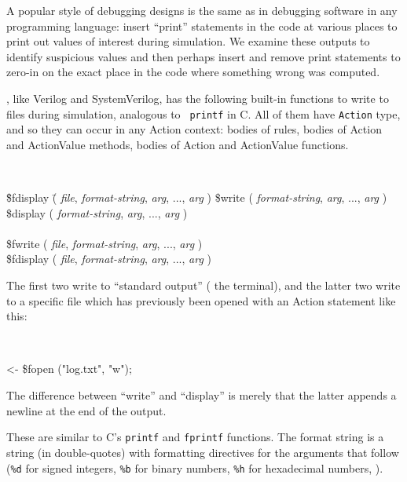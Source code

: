 \label{Sec_display_and_fmt}


A popular style of debugging {\BSV} designs is the same as in debugging
software in any programming language: insert ``print'' statements in
the {\BSV} code at various places to print out values of interest during
simulation.  We examine these outputs to identify suspicious values
and then perhaps insert and remove print statements to zero-in on the
exact place in the {\BSV} code where something wrong was computed.

{\BSV}, like Verilog and SystemVerilog, has the following built-in
functions to write to files during simulation, analogous to {\tt
printf} in C. All of them have {\tt Action} type, and so they can
occur in any Action context: bodies of rules, bodies of Action and
ActionValue methods, bodies of Action and ActionValue functions.

{\tt
\begin{tabbing}
\hmmm\= \$fdisplay \= ( {\it file}, \= {\it format-string}, {\it arg}, ..., {\it arg} ) \kill
     \> \$write    \> (             \> {\it format-string}, {\it arg}, ..., {\it arg} ) \\
     \> \$display  \> (             \> {\it format-string}, {\it arg}, ..., {\it arg} ) \\
\\
     \> \$fwrite   \> ( {\it file}, \> {\it format-string}, {\it arg}, ..., {\it arg} ) \\
     \> \$fdisplay \> ( {\it file}, \= {\it format-string}, {\it arg}, ..., {\it arg} )
\end{tabbing}
}

The first two write to ``standard output'' ({\ie} the terminal), and
the latter two write to a specific file which has previously been
opened with an Action statement like this:

{\tt
\begin{tabbing}
 <- \$fopen ("log.txt", "w");
\end{tabbing}
}

The difference between ``write'' and ``display'' is merely that the
latter appends a newline at the end of the output.

These are similar to C's \verb|printf| and \verb|fprintf| functions.
The format string is a string (in double-quotes) with formatting
directives for the arguments that follow (\verb|%d| for signed
integers, \verb|%b| for binary numbers, \verb|%h| for hexadecimal
numbers, {\etc}).

